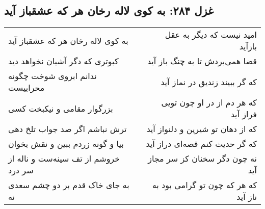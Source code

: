 \begin{center}
\section*{غزل ۲۸۴: به کوی لاله رخان هر که عشقباز آید}
\label{sec:284}
\begin{longtable}{l p{0.5cm} r}
به کوی لاله رخان هر که عشقباز آید
&&
امید نیست که دیگر به عقل بازآید
\\
کبوتری که دگر آشیان نخواهد دید
&&
قضا همی‌بردش تا به چنگ باز آید
\\
ندانم ابروی شوخت چگونه محرابیست
&&
که گر ببیند زندیق در نماز آید
\\
بزرگوار مقامی و نیکبخت کسی
&&
که هر دم از در او چون تویی فراز آید
\\
ترش نباشم اگر صد جواب تلخ دهی
&&
که از دهان تو شیرین و دلنواز آید
\\
بیا و گونه زردم ببین و نقش بخوان
&&
که گر حدیث کنم قصه‌ای دراز آید
\\
خروشم از تف سینه‌ست و ناله از سر درد
&&
نه چون دگر سخنان کز سر مجاز آید
\\
به جای خاک قدم بر دو چشم سعدی نه
&&
که هر که چون تو گرامی بود به ناز آید
\\
\end{longtable}
\end{center}
